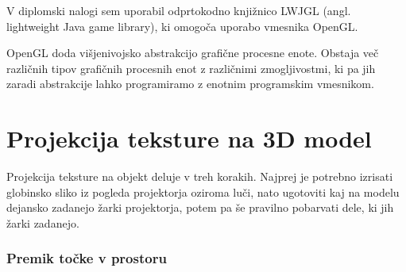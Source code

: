 \documentclass[a4paper, 12pt]{book}
\begin{document}
V diplomski nalogi sem uporabil odprtokodno knjižnico LWJGL (angl. lightweight Java game library), ki omogoča uporabo vmesnika OpenGL.

OpenGL doda višjenivojsko abstrakcijo grafične procesne enote. Obstaja več različnih tipov grafičnih procesnih enot z različnimi zmogljivostmi, ki pa jih zaradi abstrakcije lahko programiramo z enotnim programskim vmesnikom. 
\section{Projekcija teksture na 3D model}

Projekcija teksture na objekt deluje v treh korakih. Najprej je potrebno izrisati globinsko sliko iz pogleda projektorja oziroma luči, nato ugotoviti kaj na modelu dejansko zadanejo žarki projektorja, potem pa še pravilno pobarvati dele, ki jih žarki zadanejo.

\subsubsection*{Premik točke v prostoru}
\end{document}
